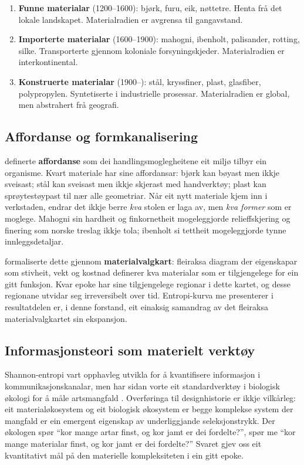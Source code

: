 \documentclass[10pt, a4paper, twocolumn]{article}
\begin{document}
\begin{enumerate}
  \item \textbf{Funne materialar} (1200--1600): bjørk, furu, eik, nøttetre. Henta frå det lokale landskapet. Materialradien er avgrensa til gangavstand.
  \item \textbf{Importerte materialar} (1600--1900): mahogni, ibenholt, palisander, rotting, silke. Transporterte gjennom koloniale forsyningskjeder. Materialradien er interkontinental.
  \item \textbf{Konstruerte materialar} (1900--): stål, kryssfiner, plast, glasfiber, polypropylen. Syntetiserte i industrielle prosessar. Materialradien er global, men abstrahert frå geografi.
\end{enumerate}

\subsection{Affordanse og formkanalisering}

\citet{gibson1977} definerte \textbf{affordanse} som dei handlingsmoglegheitene eit miljø tilbyr ein organisme. Kvart materiale har sine affordansar: bjørk kan bøyast men ikkje sveisast; stål kan sveisast men ikkje skjerast med handverktøy; plast kan sprøytestøypast til nær alle geometriar. Når eit nytt materiale kjem inn i verkstaden, endrar det ikkje berre \emph{kva} stolen er laga av, men \emph{kva former} som er moglege. Mahogni sin hardheit og finkornetheit mogeleggjorde relieffskjering og finering som norske treslag ikkje tola; ibenholt si tettheit mogeleggjorde tynne innleggsdetaljar.

\citet{ashby2013} formaliserte dette gjennom \textbf{materialvalgkart}: fleiraksa diagram der eigenskapar som stivheit, vekt og kostnad definerer kva materialar som er tilgjengelege for ein gitt funksjon. Kvar epoke har sine tilgjengelege regionar i dette kartet, og desse regionane utvidar seg irreversibelt over tid. Entropi-kurva me presenterer i resultatdelen er, i denne forstand, eit einaksig samandrag av det fleiraksa materialvalgkartet sin ekspansjon.

\subsection{Informasjonsteori som materielt verktøy}

Shannon-entropi \citep{shannon1948} vart opphavleg utvikla for å kvantifisere informasjon i kommunikasjonskanalar, men har sidan vorte eit standardverktøy i biologisk økologi for å måle artsmangfald \citep{magurran2004}. Overføringa til designhistorie er ikkje vilkårleg: eit materialøkosystem og eit biologisk økosystem er begge komplekse system der mangfald er ein emergent eigenskap av underliggjande seleksjonstrykk. Der økologen spør ``kor mange artar finst, og kor jamt er dei fordelte?'', spør me ``kor mange materialar finst, og kor jamt er dei fordelte?'' Svaret gjev oss eit kvantitativt mål på den materielle kompleksiteten i ein gitt epoke.
\end{document}
